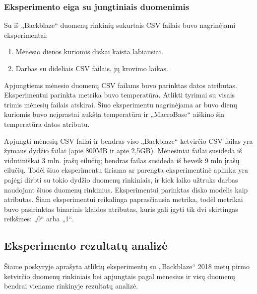\documentclass{VUMIFPSkursinis}
\begin{document}
\subsubsection{Eksperimento eiga su jungtiniais duomenimis}
Su iš „Backblaze“ duomenų rinkinių sukurtais CSV failais buvo nagrinėjami eksperimentai:
\begin{enumerate}
\item Mėnesio dienos kuriomis diskai kaista labiausiai.
\item Darbas su dideliais CSV failais, jų krovimo laikas.
\end{enumerate}

Apjungtiems mėnesio duomenų CSV failams buvo parinktas datos atributas. Eksperimentui parinkta metrika buvo temperatūra. Atlikti tyrimai su visais trimis mėnesių failais atskirai. Šiuo eksperimentu nagrinėjama ar buvo dienų kuriomis buvo neįprastai aukšta temperatūra ir „MacroBase“ aiškino šia temperatūra datos atributu.


Apjungti mėnesių CSV failai ir bendras viso „Backblaze“ ketvirčio CSV failas yra žymaus dydžio failai (apie 800MB ir apie 2,5GB). Mėnesiniai failai susideda iš vidutiniškai 3 mln. įrašų eilučių; bendras failas susideda iš beveik 9 mln įrašų eilučių. Todėl šiuo eksperimentu tiriama ar parengta eksperimentinė aplinka yra pajėgi dirbti su tokio dydžio duomenų rinkiniais, ir kiek laiko užtruks darbas naudojant šiuos duomenų rinkinius. Eksperimentui parinktas disko modelis kaip atributas. Šiam eksperimentui reikalinga paprasčiausia metrika, todėl metrikai buvo pasirinktas binarinis klaidos atributas, kuris gali įgyti tik dvi skirtingas reikšmes: „0“ arba „1“.

\subsection{Eksperimento rezultatų analizė} \label{subsec:exprez}
Šiame poskyryje aprašyta atliktų eksperimentų su „Backblaze“ 2018 metų pirmo ketvirčio duomenų rinkiniais bei apjungtais pagal mėnesius ir visų duomenų bendrai viename rinkinyje rezultatų analizė.
\end{document}
